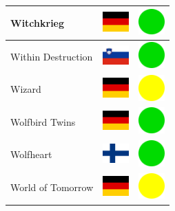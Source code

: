 \documentclass[12pt, a4paper, twoside]{report}
\begin{document}
\begin{center}
\begin{longtable}{|p{5cm}|p{2cm}|p{2cm}|}
 Witchkrieg                                                 & \includegraphics[width=1cm]{../4x3/de} &   \includegraphics[width=1cm]{../likes/y} \\ \hline
 Within Destruction                                         & \includegraphics[width=1cm]{../4x3/si} &   \includegraphics[width=1cm]{../likes/y} \\ \hline
 Wizard                                                     & \includegraphics[width=1cm]{../4x3/de} &   \includegraphics[width=1cm]{../likes/m} \\ \hline
 Wolfbird Twins                                             & \includegraphics[width=1cm]{../4x3/de} &   \includegraphics[width=1cm]{../likes/y} \\ \hline
 Wolfheart                                                  & \includegraphics[width=1cm]{../4x3/fi} &   \includegraphics[width=1cm]{../likes/y} \\ \hline
 World of Tomorrow                                          & \includegraphics[width=1cm]{../4x3/de} &   \includegraphics[width=1cm]{../likes/m} \\ \hline

\end{longtable}
\end{center}
\end{document}
